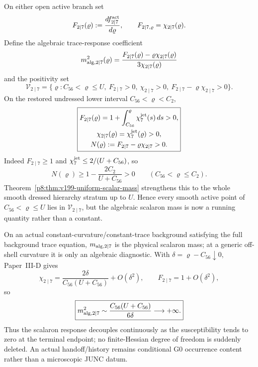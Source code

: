 \documentclass[12pt,a4paper]{article}
\begin{document}
\begin{proposition}
\label{p8:prop:smooth-active-positive-coupling-convexity}
On either open active branch set
\begin{equation}
\label{p8:eq:smooth-F-chi}
 F_{2\mid7}(\varrho):=\frac{d f_{2\mid7}^{\rm act}}{d\varrho},
 \qquad
 F_{2\mid7,\varrho}=\chi_{2\mid7}(\varrho).
\end{equation}
Define the algebraic trace-response coefficient
\begin{equation}
\label{p8:eq:smooth-local-trace-mass}
 m_{{\rm alg},2\mid7}^2(\varrho)
 =\frac{F_{2\mid7}(\varrho)-\varrho\chi_{2\mid7}(\varrho)}
 {3\chi_{2\mid7}(\varrho)}
\end{equation}
and the positivity set
\begin{equation}
\label{p8:eq:smooth-viability-domain}
\mathscr V_{2\mid7}
=\{\varrho:C_{56}<\varrho\le U,\
F_{2\mid7}>0,\ \chi_{2\mid7}>0,\
F_{2\mid7}-\varrho\chi_{2\mid7}>0\}.
\end{equation}
On the restored undressed lower interval \(C_{56}<\varrho<C_2\),
\begin{equation}
\label{p8:eq:laur17-lower-local-viability}
 \boxed{\begin{gathered}
 F_{2\mid7}(\varrho)=1+\int_{C_{56}}^{\varrho}\chi_7^{\rm jet}(s)\,ds>0,\\
 \chi_{2\mid7}(\varrho)=\chi_7^{\rm jet}(\varrho)>0,\\
 N(\varrho):=F_{2\mid7}-\varrho\chi_{2\mid7}>0.
 \end{gathered}}
\end{equation}
Indeed \(F_{2\mid7}\ge1\) and
\(\chi_7^{\rm jet}\le2/(U+C_{56})\), so
\[
 N(\varrho)\ge1-\frac{2C_2}{U+C_{56}}>0
 \qquad(C_{56}<\varrho\le C_2).
\]
Theorem~\ref{p8:thm:v199-uniform-scalar-mass} strengthens this to the whole
smooth dressed hierarchy stratum up to \(U\).  Hence every smooth active point
of \(C_{56}<\varrho\le U\) lies in \(\mathscr V_{2\mid7}\), but the
algebraic scalaron mass is now a running quantity rather than a constant.

On an actual constant-curvature/constant-trace background satisfying the full
background trace equation, \(m_{{\rm alg},2\mid7}\) is the physical scalaron mass;
at a generic off-shell curvature it is only an algebraic diagnostic.  With
\(\delta=\varrho-C_{56}\downarrow0\), Paper~III-D gives
\[
 \chi_{2\mid7}=\frac{2\delta}{C_{56}(U+C_{56})}+O(\delta^2),\qquad
 F_{2\mid7}=1+O(\delta^2),
\]
so
\[
 \boxed{m_{{\rm alg},2\mid7}^2
 \sim\frac{C_{56}(U+C_{56})}{6\delta}\longrightarrow+\infty.}
\]
Thus the scalaron response decouples continuously as the susceptibility tends to zero at the
terminal endpoint; no finite-Hessian degree of freedom is suddenly deleted.
An actual handoff/history remains conditional G0 occurrence content rather
than a microscopic JUNC datum.
\end{proposition}
\end{document}
